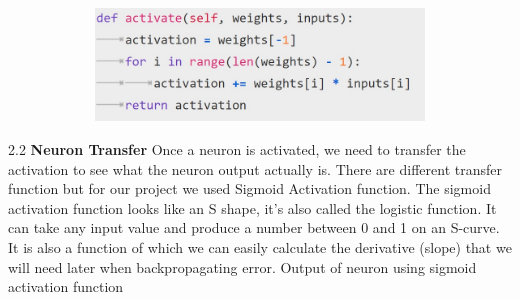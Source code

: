 \begin{figure}[H]
\begin{center}
\includegraphics[width=120mm,height=30mm]{backexplain/activate.jpg}
\end{center}
     
\end{figure}            
            


2.2 \textbf{Neuron Transfer}
Once a neuron is activated, we need to transfer the activation to see what the neuron output actually is.
There are different transfer function but for our project we used Sigmoid Activation function.\newline
The sigmoid activation function looks like an S shape, it’s also called the logistic function. It can take any input value and produce a number between 0 and 1 on an S-curve. It is also a function of which we can easily calculate the derivative (slope) that we will need later when backpropagating error.
\newline
Output of neuron using sigmoid activation function \newline
